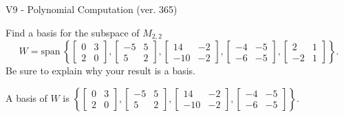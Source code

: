 \begin{exercise}
  \begin{exerciseTitle}V9 - Polynomial Computation (ver. 365)\end{exerciseTitle}
  \begin{exerciseStatement}
    Find a basis for the subspace of \(M_{2,2}\) 
\[W=\mathrm{span}\ \left\{\left[\begin{array}{cc}
0 & 3 \\
2 & 0
\end{array}\right] , \left[\begin{array}{cc}
-5 & 5 \\
5 & 2
\end{array}\right] , \left[\begin{array}{cc}
14 & -2 \\
-10 & -2
\end{array}\right] , \left[\begin{array}{cc}
-4 & -5 \\
-6 & -5
\end{array}\right] , \left[\begin{array}{cc}
2 & 1 \\
-2 & 1
\end{array}\right]\right\}.\]
 Be sure to explain why your result is a basis.


  \end{exerciseStatement}
  \begin{exerciseAnswer}
   A basis of \(W\) is  \(\left\{\left[\begin{array}{cc}
0 & 3 \\
2 & 0
\end{array}\right] , \left[\begin{array}{cc}
-5 & 5 \\
5 & 2
\end{array}\right] , \left[\begin{array}{cc}
14 & -2 \\
-10 & -2
\end{array}\right] , \left[\begin{array}{cc}
-4 & -5 \\
-6 & -5
\end{array}\right]\right\}\).
  


  \end{exerciseAnswer}
\end{exercise}